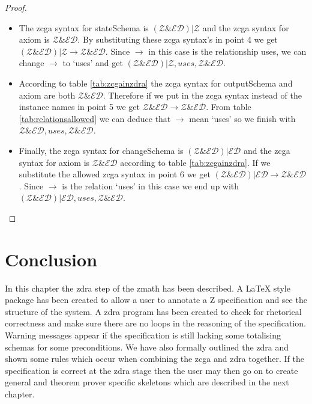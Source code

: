 \begin{proof}
\begin{itemize}
\item The \gls{zcga} syntax for stateSchema is $(\mathcal{Z} \& \mathcal{ED}) |
\mathcal{Z}$ and the \gls{zcga} syntax for axiom is  $\mathcal{Z} \&
\mathcal{ED}$. By substituting these \gls{zcga} syntax's in point 4 we get
$(\mathcal{Z} \& \mathcal{ED}) | \mathcal{Z} \longrightarrow \mathcal{Z} \&
\mathcal{ED}$. Since $\longrightarrow$ in this case is the relationship uses, we
can change $\longrightarrow$ to `uses' and get $(\mathcal{Z} \& \mathcal{ED}) |
\mathcal{Z}, uses, \mathcal{Z} \& \mathcal{ED}$.

\item According to table \ref{tab:zcgainzdra} the \gls{zcga} syntax for
outputSchema and axiom are both $\mathcal{Z} \& \mathcal{ED}$. Therefore if we
put in the \gls{zcga} syntax instead of the instance names in point 5 we get
$\mathcal{Z} \& \mathcal{ED} \longrightarrow \mathcal{Z} \& \mathcal{ED}$. From
table \ref{tab:relationsallowed} we can deduce that $\longrightarrow$ mean
`uses' so we finish with $\mathcal{Z} \& \mathcal{ED}, uses, \mathcal{Z} \&
\mathcal{ED}$.

\item Finally, the \gls{zcga} syntax for changeSchema is $(\mathcal{Z} \&
\mathcal{ED}) | \mathcal{ED}$ and the \gls{zcga} syntax for axiom is
$\mathcal{Z} \& \mathcal{ED}$ according to table \ref{tab:zcgainzdra}. If we
substitute the allowed \gls{zcga} syntax in point 6 we get $(\mathcal{Z} \&
\mathcal{ED}) | \mathcal{ED} \longrightarrow \mathcal{Z} \& \mathcal{ED}$. Since
$\longrightarrow$ is the relation `uses' in this case we end up with
$(\mathcal{Z} \& \mathcal{ED}) | \mathcal{ED}, uses, \mathcal{Z} \&
\mathcal{ED}$.
\end{itemize}
\end{proof}

\section{Conclusion}
In this chapter the \gls{zdra} step of the \gls{zmath} has been described. A
\LaTeX{} style package has been created to allow a user to annotate a Z
specification and see the structure of the system. A \gls{zdra} program has been
created to check for rhetorical correctness and make sure there are no loops in
the reasoning of the specification. Warning messages appear if the specification
is still lacking some totalising schemas for some preconditions. We have also
formally outlined the \gls{zdra} and shown some rules which occur when combining
the \gls{zcga} and \gls{zdra} together. If the specification is correct at the
\gls{zdra} stage then the user may then go on to create general and theorem
prover specific skeletons which are described in the next chapter.